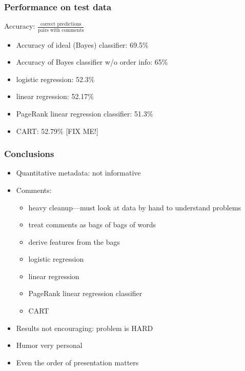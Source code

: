 \documentclass[fleqn]{beamer}
\begin{document}
\begin{frame}
\frametitle{Performance on test data}
  \begin{center}
        Accuracy: $\frac{\mbox{correct predictions}}{\mbox{pairs with comments}}$
    \end{center}
    
      \begin{itemize}
        \item Accuracy of ideal (Bayes) classifier: 69.5\% 
        \item Accuracy of Bayes classifier w/o order info: 65\%
        \item logistic regression: 52.3\%
        \item linear regression: 52.17\%
        \item PageRank linear regression classifier: 51.3\%
        \item CART: 52.79\% [FIX ME!]
    \end{itemize}

\end{frame}

\begin{frame}
\frametitle{Conclusions}
    \begin{itemize}
        \item Quantitative metadata: not informative
        \item Comments: 
        	\begin{itemize}
	   \item heavy cleanup---must look at data by hand to understand problems
	   \item treat comments as bags of bags of words
	   \item derive features from the bags
	   \item logistic regression
	   \item linear regression
	   \item PageRank linear regression classifier
	   \item CART
	\end{itemize}
       \item Results not encouraging: problem is HARD
       \item Humor very personal
       \item Even the order of presentation matters
    \end{itemize}

\end{frame}
\end{document}
